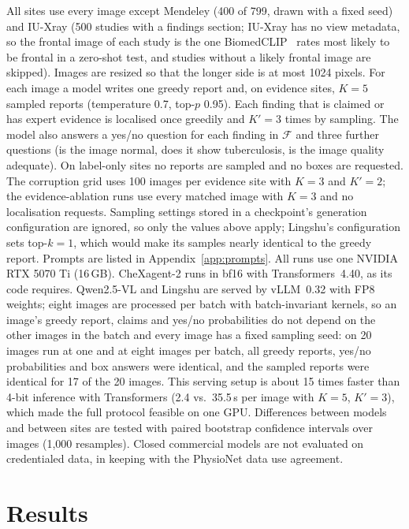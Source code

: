 \documentclass[pdflatex,sn-mathphys-num]{sn-jnl}
\theoremstyle{thmstyleone}
\begin{document}
All sites use every image except Mendeley (400 of 799, drawn with a fixed seed) and IU-Xray (500 studies with a findings section; IU-Xray has no view metadata, so the frontal image of each study is the one BiomedCLIP~\cite{biomedclip} rates most likely to be frontal in a zero-shot test, and studies without a likely frontal image are skipped). Images are resized so that the longer side is at most 1024 pixels. For each image a model writes one greedy report and, on evidence sites, $K=5$ sampled reports (temperature 0.7, top-$p$ 0.95). Each finding that is claimed or has expert evidence is localised once greedily and $K'=3$ times by sampling. The model also answers a yes/no question for each finding in $\mathcal{F}$ and three further questions (is the image normal, does it show tuberculosis, is the image quality adequate). On label-only sites no reports are sampled and no boxes are requested. The corruption grid uses 100 images per evidence site with $K=3$ and $K'=2$; the evidence-ablation runs use every matched image with $K=3$ and no localisation requests. Sampling settings stored in a checkpoint's generation configuration are ignored, so only the values above apply; Lingshu's configuration sets top-$k=1$, which would make its samples nearly identical to the greedy report. Prompts are listed in Appendix~\ref{app:prompts}. All runs use one NVIDIA RTX 5070 Ti (16\,GB). CheXagent-2 runs in bf16 with Transformers~4.40, as its code requires. Qwen2.5-VL and Lingshu are served by vLLM~0.32 with FP8 weights; eight images are processed per batch with batch-invariant kernels, so an image's greedy report, claims and yes/no probabilities do not depend on the other images in the batch and every image has a fixed sampling seed: on 20 images run at one and at eight images per batch, all greedy reports, yes/no probabilities and box answers were identical, and the sampled reports were identical for 17 of the 20 images. This serving setup is about 15 times faster than 4-bit inference with Transformers (2.4 vs.\ 35.5\,s per image with $K=5$, $K'=3$), which made the full protocol feasible on one GPU. Differences between models and between sites are tested with paired bootstrap confidence intervals over images (1{,}000 resamples). Closed commercial models are not evaluated on credentialed data, in keeping with the PhysioNet data use agreement.

\section{Results}\label{sec:results}
\end{document}
